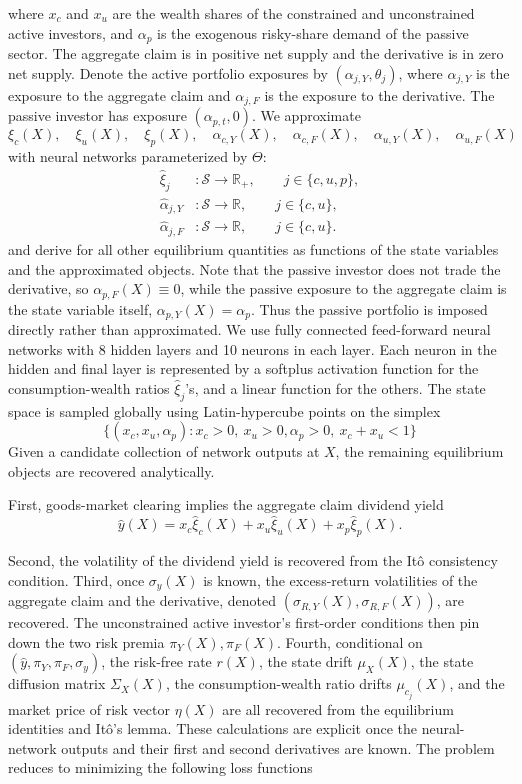 where $x_{c}$ and $x_{u}$ are the wealth shares of the constrained and unconstrained active investors, and $\alpha_{p}$ is the exogenous risky-share demand of the passive sector.
The aggregate claim is in positive net supply and the derivative is in zero net supply.
Denote the active portfolio exposures by $(\alpha_{j,Y},\theta_j)$, where $\alpha_{j,Y}$ is the exposure to the aggregate claim and $\alpha_{j,F}$ is the exposure to the derivative.
The passive investor has exposure $(\alpha_{p,t},0)$.
We approximate
\[
{\xi}_c(X),\quad {\xi}_u(X), \quad {\xi}_p(X),\quad
{\alpha}_{c,Y}(X), \quad {\alpha}_{c,F}(X),\quad
{\alpha}_{u,Y}(X), \quad {\alpha}_{u,F}(X)
\]
with neural networks parameterized by $\Theta$:
\begin{align}
    \hat\xi_j &: \mathcal S\to\mathbb R_+, \qquad j\in\{c,u,p\}, \\
    \hat\alpha_{j,Y}&: \mathcal S\to\mathbb R, \qquad j\in\{c,u\}, \\
    \hat\alpha_{j,F} &: \mathcal S\to\mathbb R, \qquad j\in\{c,u\}.
\end{align}
and derive for all other equilibrium quantities as functions of the state variables and the approximated objects.
Note that the passive investor does not trade the derivative, so $\alpha_{p,F}(X)\equiv 0$, while the passive exposure to the aggregate claim is the state variable itself, $\alpha_{p,Y}(X)=\alpha_p$.
Thus the passive portfolio is imposed directly rather than approximated.
We use fully connected feed-forward neural networks with 8 hidden layers and 10 neurons in each layer.
Each neuron in the hidden and final layer is represented by a softplus activation function for the consumption-wealth ratios $\hat\xi_j$'s, and a linear function for the others.
The state space is sampled globally using Latin-hypercube points on the simplex
\[
\{(x_c,x_u,\alpha_p): x_c>0,\ x_u>0, \alpha_p >0, \ x_c+x_u<1\}
\]
Given a candidate collection of network outputs at $X$, the remaining equilibrium objects are recovered analytically.

First, goods-market clearing implies the aggregate claim dividend yield
\begin{equation}
\hat y(X)=x_c\hat\xi_c(X)+x_u\hat\xi_u(X)+x_p\hat\xi_p(X).
\end{equation}

Second, the volatility of the dividend yield is recovered from the It\^o consistency condition.
Third, once $\sigma_y(X)$ is known, the excess-return volatilities of the aggregate claim and the derivative, denoted $(\sigma_{R,Y}(X),\sigma_{R,F}(X))$, are recovered.
The unconstrained active investor's first-order conditions then pin down the two risk premia $\pi_Y(X), \pi_F(X)$.
Fourth, conditional on $(\hat y,\pi_Y,\pi_F,\sigma_y)$, the risk-free rate $r(X)$, the state drift $\mu_X(X)$, the state diffusion matrix $\Sigma_X(X)$, the consumption-wealth ratio drifts $\mu_{c_j}(X)$, and the market price of risk vector $\eta(X)$ are all recovered from the equilibrium identities and It\^o's lemma.
These calculations are explicit once the neural-network outputs and their first and second derivatives are known.
The problem reduces to minimizing the following loss functions

